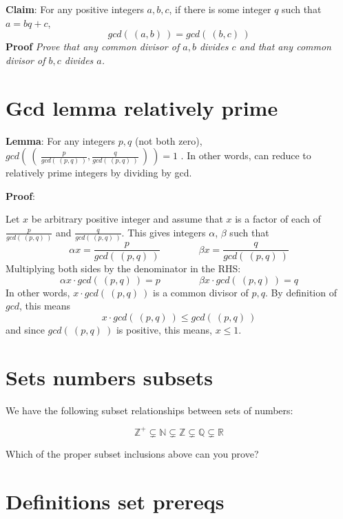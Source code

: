 \documentclass[12pt, oneside]{article}
\begin{document}
{\bf Claim}: For any positive integers $a,b,c$, if there is some integer $q$ such that $a = bq + c$,
\[
    gcd(~(a,b)~) = gcd (~(b,c)~)
\]
{\bf Proof} {\it Prove that any common divisor of $a,b$ divides $c$ and that any common 
divisor of $b,c$ divides $a$.}

\vspace{150pt}
 \vfill
\section*{Gcd lemma relatively prime}


{\bf Lemma}: For any integers $p, q$ (not both zero), 
$gcd \left(~ \left(~\frac{p}{gcd(~(p,q)~)}, \frac{q}{gcd(~(p,q)~)} ~\right) ~\right) = 1$ .
In other words, can reduce to relatively prime integers by dividing by gcd.

{\bf Proof}:

Let $x$ be arbitrary positive integer and assume that $x$ is a 
factor of each of $\frac{p}{gcd(~(p,q)~)}$ and $\frac{q}{gcd(~(p,q)~)}$. 
This gives integers $\alpha$, $\beta$ such that 
\[
    \alpha x = \frac{p}{gcd(~(p,q)~)} \qquad \qquad \beta x = \frac{q}{gcd(~(p,q)~)}
\]
Multiplying both sides by the denominator in the RHS: 
\[
    \alpha x \cdot gcd(~(p,q)~)= p \qquad \qquad \beta x \cdot gcd(~(p,q)~)= q
\]
In other words, $x \cdot gcd(~(p,q)~)$ is a common divisor of $p, q$. By definition of $gcd$, this means
\[
    x \cdot gcd (~(p,q)~) \leq gcd (~(p,q)~)
\]
and since $gcd(~(p,q)~)$ is positive, this means, $x \leq 1$.
\vspace{350pt}
 \vfill
\section*{Sets numbers subsets}


We have the following subset relationships between sets of numbers:

\[
    \mathbb{Z}^{+} \subsetneq \mathbb{N} \subsetneq \mathbb{Z} \subsetneq \mathbb{Q} \subsetneq \mathbb{R}
\]


Which of the proper subset inclusions above can you prove?

\vspace{50pt} \vfill
\section*{Definitions set prereqs}
\end{document}
